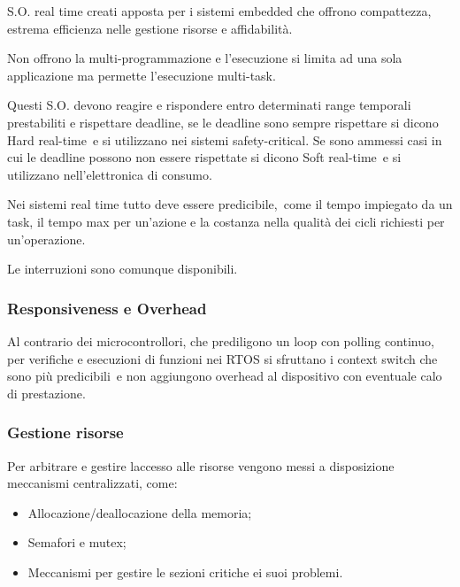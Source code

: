 \documentclass[
]{article}
\providecommand{\tightlist}{%
  \setlength{\itemsep}{0pt}\setlength{\parskip}{0pt}}
\begin{document}
{S.O. real time creati apposta per i sistemi embedded che offrono
compattezza, estrema efficienza nelle gestione risorse e affidabilità. }

{Non offrono la multi-programmazione e l'esecuzione si limita ad una
sola applicazione ma permette l'esecuzione multi-task.}

{Questi S.O. devono reagire e rispondere entro determinati range
temporali prestabiliti e rispettare deadline, se le deadline sono sempre
rispettare si dicono }{Hard real-time}{~e si utilizzano nei sistemi
safety-critical. Se sono ammessi casi in cui le deadline possono non
essere rispettate si dicono }{Soft real-time}{~e si utilizzano
nell'elettronica di consumo.}

{}

{Nei sistemi real time }{tutto deve essere }{predicibile}{,}{~come il
tempo impiegato da un task, il tempo max per un'azione e la costanza
nella qualità dei cicli richiesti per un'operazione. }

{Le interruzioni sono comunque disponibili.}

{}

\subsubsection{\texorpdfstring{{Responsiveness e
Overhead}}{Responsiveness e Overhead}}\label{h.domkgs3y1lwg}

{Al contrario dei microcontrollori, che prediligono un loop con polling
continuo, per verifiche e esecuzioni di funzioni nei RTOS si sfruttano i
context switch che sono più }{predicibili}{~e non aggiungono overhead al
dispositivo con eventuale calo di prestazione.}

{}

\subsubsection{\texorpdfstring{{Gestione
risorse}}{Gestione risorse}}\label{h.2gcmwl2c1416}

{Per arbitrare e gestire l\textquotesingle accesso alle risorse vengono
messi a disposizione meccanismi centralizzati, come: }

\begin{itemize}
\tightlist
\item
  {Allocazione/deallocazione della memoria;}
\item
  {Semafori e mutex;}
\item
  {Meccanismi per gestire le sezioni critiche ei suoi problemi.}
\end{itemize}
\end{document}
